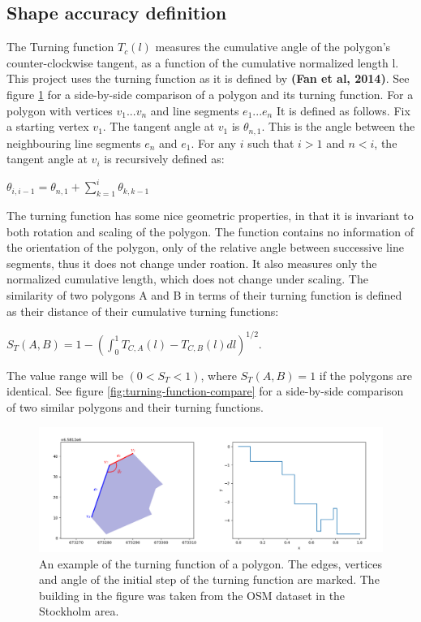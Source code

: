 \documentclass{kththesis}
\begin{document}
\subsection{Shape accuracy definition}

The Turning function $T_c(l)$ measures the cumulative angle of the polygon's counter-clockwise tangent, as a function of the cumulative normalized length l.
This project uses the turning function as it is defined by \textbf{(Fan et al, 2014)}.
See figure \ref{fig:turning-function} for a side-by-side comparison of a polygon and its turning function.
For a polygon with vertices ${v_1 ... v_n}$ and line segments ${e_1 ... e_n}$ It is defined as follows.
Fix a starting vertex $v_1$.
The tangent angle at $v_1$ is $\theta_{n,1}$. This is the angle between the neighbouring line segments $e_n$ and $e_1$.
For any $i$ such that $i>1$ and $n<i$, the tangent angle at $v_i$ is recursively defined as:
\begin{center}
    $\theta_{i, i-1} = \theta_{n,1} + \sum^{i}_{k=1} \theta_{k, k-1}$
\end{center}
The turning function has some nice geometric properties, in that it is invariant to both rotation and scaling of the polygon. The function contains no information of the orientation of the polygon, only of the relative angle between successive line segments, thus it does not change under roation. It also measures only the normalized cumulative length, which does not change under scaling.
The similarity of two polygons A and B in terms of their turning function is defined as their distance of their cumulative turning functions:
\begin{center}
    $S_{T}(A, B) = 1 - (\int^{1}_{0} T_{C,A}(l) - T_{C,B}(l) dl)^{1/2}$.
\end{center}
The value range will be $(0 < S_{T} < 1)$, where $S_{T}(A,B) = 1$ if the polygons are identical. 
See figure \ref{fig:turning-function-compare} for a side-by-side comparison of two similar polygons and their turning functions.

\begin{figure}[H]
    \centering
    \includegraphics[width=\textwidth,height=0.5\textheight,keepaspectratio]{img_turn_function}
    \caption{An example of the turning function of a polygon. The edges, vertices and angle of the initial step of the turning function are marked. The building in the figure was taken from the OSM dataset in the Stockholm area.}
    \label{fig:turning-function}
\end{figure}
\end{document}
